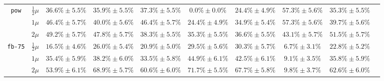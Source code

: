 \begin{table}[htpb]
{\begin{tabular}{cccccccccc}
        \midrule
        
        \multirow{3}{*}{\texttt{pow}} 
        & $\frac{1}{2}\mu$ & $36.6\% \pm 5.5\%$ & $35.9\% \pm 5.5\%$ & $37.3\% \pm 5.5\%$ & $0.0\% \pm 0.0\%$ & $24.4\% \pm 4.9\%$ & $\mathbf{57.3\% \pm 5.6\%}$ & $35.3\% \pm 5.5\%$ \\ 
        & $1\mu$ & $46.4\% \pm 5.7\%$ & $40.0\% \pm 5.6\%$ & $46.4\% \pm 5.7\%$ & $24.4\% \pm 4.9\%$ & $34.9\% \pm 5.4\%$ & $\mathbf{57.3\% \pm 5.6\%}$ & $39.7\% \pm 5.6\%$ \\ 
        & $2\mu$ & $49.2\% \pm 5.7\%$ & $47.8\% \pm 5.7\%$ & $38.3\% \pm 5.5\%$ & $35.3\% \pm 5.5\%$ & $36.6\% \pm 5.5\%$ & $43.1\% \pm 5.7\%$ & $\mathbf{51.5\% \pm 5.7\%}$ \\ 
        
        \midrule
        
        \multirow{3}{*}{\texttt{fb-75}} 
        & $\frac{1}{2}\mu$ & $16.5\% \pm 4.6\%$ & $26.0\% \pm 5.4\%$ & $20.9\% \pm 5.0\%$ & $29.5\% \pm 5.6\%$ & $\mathbf{30.3\% \pm 5.7\%}$ & $6.7\% \pm 3.1\%$ & $22.8\% \pm 5.2\%$ \\ 
        & $1\mu$ & $35.4\% \pm 5.9\%$ & $38.2\% \pm 6.0\%$ & $33.5\% \pm 5.8\%$ & $\mathbf{44.9\% \pm 6.1\%}$ & $42.5\% \pm 6.1\%$ & $9.1\% \pm 3.5\%$ & $35.8\% \pm 5.9\%$ \\ 
        & $2\mu$ & $53.9\% \pm 6.1\%$ & $68.9\% \pm 5.7\%$ & $60.6\% \pm 6.0\%$ & $\mathbf{71.7\% \pm 5.5\%}$ & $67.7\% \pm 5.8\%$ & $9.8\% \pm 3.7\%$ & $62.6\% \pm 6.0\%$ \\ 

        \bottomrule
    \end{tabular}
    }
\end{table}


